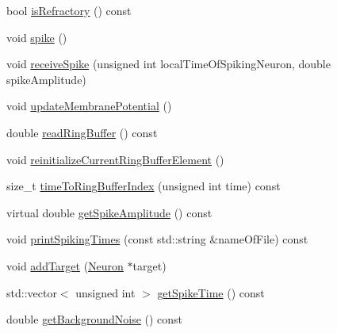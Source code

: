 \begin{DoxyCompactItemize}
bool \hyperlink{classNeuron_aa40fbb2b025efb1db420da32e16741c1}{is\-Refractory} () const 
\item 
void \hyperlink{classNeuron_a955ecfd2984f75c18664bd370c34af1d}{spike} ()
\item 
void \hyperlink{classNeuron_aa8111a347de6ddfb6c799bdcd3092cb7}{receive\-Spike} (unsigned int local\-Time\-Of\-Spiking\-Neuron, double spike\-Amplitude)
\item 
void \hyperlink{classNeuron_a41a81d8527734e59bae39f73fece887f}{update\-Membrane\-Potential} ()
\item 
double \hyperlink{classNeuron_a763493ef8eff51a638cbb75f0983b828}{read\-Ring\-Buffer} () const 
\item 
void \hyperlink{classNeuron_a41dd9577d84a48bd427201b4b8234150}{reinitialize\-Current\-Ring\-Buffer\-Element} ()
\item 
size\-\_\-t \hyperlink{classNeuron_af1c7b80b5e70e906734ce710d37b1fd7}{time\-To\-Ring\-Buffer\-Index} (unsigned int time) const 
\item 
virtual double \hyperlink{classNeuron_aec2283fbfaba764cd088e6d16b0a74bb}{get\-Spike\-Amplitude} () const 
\item 
void \hyperlink{classNeuron_a15b3eaa67535301e011d5cd8d53a61d1}{print\-Spiking\-Times} (const std\-::string \&name\-Of\-File) const 
\item 
void \hyperlink{classNeuron_a9bf071c800e76fa7fbd611cee7cd76d6}{add\-Target} (\hyperlink{classNeuron}{Neuron} $\ast$target)
\item 
std\-::vector$<$ unsigned int $>$ \hyperlink{classNeuron_a5e14b82bebab09904d558298f343061c}{get\-Spike\-Time} () const 
\item 
double \hyperlink{classNeuron_a5487631e8982ae2368da0917535a9001}{get\-Background\-Noise} () const 
\end{DoxyCompactItemize}



